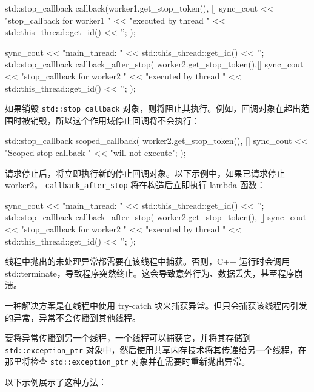 \begin{cpp}
std::stop_callback callback(worker1.get_stop_token(), []{
    sync_cout << "stop_callback for worker1 "
              << "executed by thread "
              << std::this_thread::get_id() << '\n';
});

sync_cout << "main_thread: "
          << std::this_thread::get_id() << '\n';
std::stop_callback callback_after_stop(
    worker2.get_stop_token(),[] {
        sync_cout << "stop_callback for worker2 "
                  << "executed by thread "
                  << std::this_thread::get_id() << '\n';
});
\end{cpp}

如果销毁 \verb|std::stop_callback| 对象，则将阻止其执行。例如，回调对象在超出范围时被销毁，所以这个作用域停止回调将不会执行：

\begin{cpp}
{
    std::stop_callback scoped_callback(
    worker2.get_stop_token(), []{
        sync_cout << "Scoped stop callback "
                  << "will not execute\n";
    }
    );
}
\end{cpp}

请求停止后，将立即执行新的停止回调对象。以下示例中，如果已请求停止 worker2， \verb|callback_after_stop| 将在构造后立即执行 lambda 函数：

\begin{cpp}
sync_cout << "main_thread: "
          << std::this_thread::get_id() << '\n';
std::stop_callback callback_after_stop(
    worker2.get_stop_token(), []{
        sync_cout << "stop_callback for worker2 "
                  << "executed by thread "
                  << std::this_thread::get_id() << '\n';
    }
);
\end{cpp}


线程中抛出的未处理异常都需要在该线程中捕获。否则，C++ 运行时会调用 std::terminate，导致程序突然终止。这会导致意外行为、数据丢失，甚至程序崩溃。

一种解决方案是在线程中使用 try-catch 块来捕获异常。但只会捕获该线程内引发的异常，异常不会传播到其他线程。

要将异常传播到另一个线程，一个线程可以捕获它，并将其存储到 \verb|std::exception_ptr| 对象中，然后使用共享内存技术将其传递给另一个线程，在那里将检查 \verb|std::exception_ptr| 对象并在需要时重新抛出异常。

以下示例展示了这种方法：

